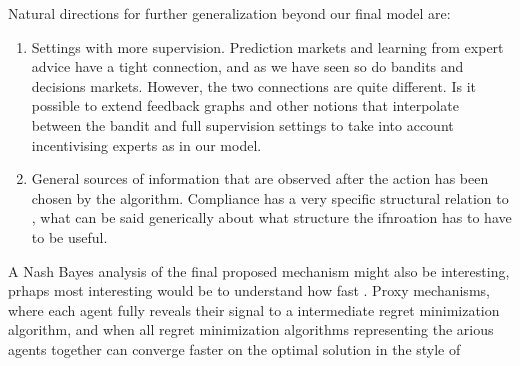 Natural directions for further generalization beyond our final model are:

\begin{enumerate}

\item Settings with more supervision. Prediction markets and learning from expert advice have a tight connection, and as we have seen so do bandits and decisions markets. However, the two connections are quite different. Is it possible to extend feedback graphs and other notions that interpolate between the bandit and full supervision settings to take into account incentivising experts as in our model. 

\item General sources of information that are observed after the action has been chosen by the algorithm. Compliance has a very specific structural relation to , what can be said generically about what structure the ifnroation has to have to be useful.

\end{enumerate}

A Nash Bayes analysis of the final proposed mechanism might also be interesting, prhaps most interesting would be to understand how fast .
Proxy mechanisms, where each agent fully reveals their signal to a intermediate regret minimization algorithm, and when all regret minimization algorithms representing the arious agents together can converge faster on the optimal solution in the style of \cite{syrgkanis2015fast}




